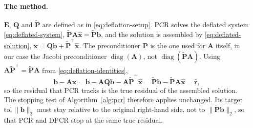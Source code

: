 \paragraph{The method.}
$\mathbf{E}$, $\mathbf{Q}$ and $\tilde{\mathbf{P}}$ are defined as in
\eqref{eq:deflation-setup}. PCR solves the deflated system
\eqref{eq:deflated-system}, $\tilde{\mathbf{P}}\mathbf{A}\hat{\mathbf{x}} =
\tilde{\mathbf{P}}\mathbf{b}$, and the solution is assembled by
\eqref{eq:deflated-solution}, $\mathbf{x} = \mathbf{Q}\mathbf{b} +
\tilde{\mathbf{P}}^\top\hat{\mathbf{x}}$. The preconditioner $\mathbf{P}$ is
the one used for $\mathbf{A}$ itself, in our case the Jacobi preconditioner
$\operatorname{diag}(\mathbf{A})$, not $\operatorname{diag}(\tilde{\mathbf{P}}\mathbf{A})$.
Using $\mathbf{A}\tilde{\mathbf{P}}^\top = \tilde{\mathbf{P}}\mathbf{A}$ from
\eqref{eq:deflation-identities},
\begin{equation}
  \mathbf{b} - \mathbf{A}\mathbf{x}
  = \mathbf{b} - \mathbf{A}\mathbf{Q}\mathbf{b} - \mathbf{A}\tilde{\mathbf{P}}^\top\hat{\mathbf{x}}
  = \tilde{\mathbf{P}}\mathbf{b} - \tilde{\mathbf{P}}\mathbf{A}\hat{\mathbf{x}}
  = \hat{\mathbf{r}} ,
  \label{eq:dpcr-residual}
\end{equation}
so the residual that PCR tracks is the true residual of the assembled
solution. The stopping test of Algorithm~\ref{alg:pcr} therefore applies
unchanged. Its target $\mathrm{tol}\,\|\mathbf{b}\|_2$ must stay relative to
the original right-hand side, not to $\|\tilde{\mathbf{P}}\mathbf{b}\|_2$, so
that PCR and DPCR stop at the same true residual.

